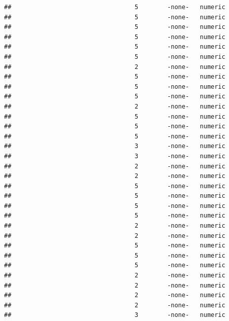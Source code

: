 \documentclass[
  12pt,
]{article}
\begin{document}
\begin{verbatim}
##                                  5        -none-   numeric                    
##                                  5        -none-   numeric                    
##                                  5        -none-   numeric                    
##                                  5        -none-   numeric                    
##                                  5        -none-   numeric                    
##                                  5        -none-   numeric                    
##                                  2        -none-   numeric                    
##                                  5        -none-   numeric                    
##                                  5        -none-   numeric                    
##                                  5        -none-   numeric                    
##                                  2        -none-   numeric                    
##                                  5        -none-   numeric                    
##                                  5        -none-   numeric                    
##                                  5        -none-   numeric                    
##                                  3        -none-   numeric                    
##                                  3        -none-   numeric                    
##                                  2        -none-   numeric                    
##                                  2        -none-   numeric                    
##                                  5        -none-   numeric                    
##                                  5        -none-   numeric                    
##                                  5        -none-   numeric                    
##                                  5        -none-   numeric                    
##                                  2        -none-   numeric                    
##                                  2        -none-   numeric                    
##                                  5        -none-   numeric                    
##                                  5        -none-   numeric                    
##                                  5        -none-   numeric                    
##                                  2        -none-   numeric                    
##                                  2        -none-   numeric                    
##                                  2        -none-   numeric                    
##                                  2        -none-   numeric                    
##                                  3        -none-   numeric                    

\end{verbatim}
\end{document}
